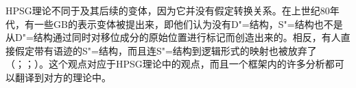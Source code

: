 HPSG理论不同于\gbtc 及其后续的变体，因为它并没有假定转换关系。在上世纪80年代，有一些GB的表示变体被提出来，即他们认为没有D"=结构，S"=结构也不是从D"=结构通过同时对移位成分的原始位置进行标记而创造出来的。相反，有人直接假定带有语迹的S"=结构，而且连S"=结构到逻辑形式的映射也被放弃了（\citealp{Koster78b-u}；\citealp[\S~1.4]{Haider93a}；\citealp[]{Frey93a}）。这个观点对应于HPSG理论中的观点，而且一个框架内的许多分析都可以翻译到对方的理论中。

